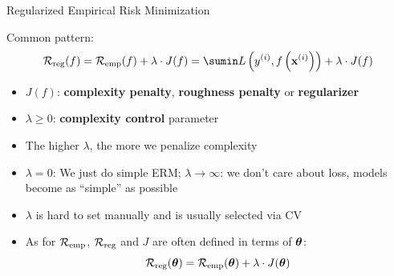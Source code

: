 \documentclass[11pt,compress,t,notes=noshow, xcolor=table]{beamer}
\begin{document}
\begin{vbframe}{Regularized Empirical Risk Minimization}

  Common pattern:
  $$
  \riskrf = \riskef + \lambda \cdot J(f) = \sumin \Lxyi + \lambda \cdot J(f)
  $$
\begin{itemize}


  \item $J(f)$: \textbf{complexity penalty}, \textbf{roughness penalty} or \textbf{regularizer}
  \item $\lambda \geq 0$: \textbf{complexity control} parameter
  \item The higher $\lambda$, the more we penalize complexity

  \item $\lambda = 0$: We just do simple ERM; $\lambda \to \infty$: we don't care about loss, models become as \enquote{simple} as possible

\item $\lambda$ is hard to set manually and is usually selected via CV

  \item As for $\mathcal{R}_{\text{emp}}$, $\mathcal{R}_{\text{reg}}$ and $J$ are often defined in terms of $\bm{\theta}$: \\
  
  $$\mathcal{R}_{\text{reg}}(\bm{\theta}) = \mathcal{R}_{\text{emp}}(\bm{\theta}) + \lambda \cdot J(\bm{\theta})$$


\end{itemize}







\end{vbframe}



\endlecture
\end{document}
